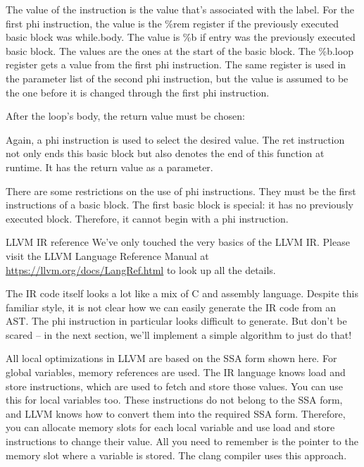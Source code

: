 The value of the instruction is the value that’s associated with the label. For the first phi instruction, the value is the \%rem register if the previously executed basic block was while.body. The value is \%b if entry was the previously executed basic block. The values are the ones at the start of the basic block. The \%b.loop register gets a value from the first phi instruction. The same register is used in the parameter list of the second phi instruction, but the value is assumed to be the one before it is changed through the first phi instruction.

After the loop’s body, the return value must be chosen:

\begin{shell}
return:
                      [ %
    ret i32 %
}
\end{shell}

Again, a phi instruction is used to select the desired value. The ret instruction not only ends this basic block but also denotes the end of this function at runtime. It has the return value as a parameter.

There are some restrictions on the use of phi instructions. They must be the first instructions of a basic block. The first basic block is special: it has no previously executed block. Therefore, it cannot begin with a phi instruction.

\begin{myTip}{LLVM IR reference}
We’ve only touched the very basics of the LLVM IR. Please visit the LLVM Language Reference Manual at \url{https://llvm.org/docs/LangRef.html} to look up all the details.
\end{myTip}

The IR code itself looks a lot like a mix of C and assembly language. Despite this familiar style, it is not clear how we can easily generate the IR code from an AST. The phi instruction in particular looks difficult to generate. But don’t be scared – in the next section, we’ll implement a simple algorithm to just do that!


All local optimizations in LLVM are based on the SSA form shown here. For global variables, memory references are used. The IR language knows load and store instructions, which are used to fetch and store those values. You can use this for local variables too. These instructions do not belong to the SSA form, and LLVM knows how to convert them into the required SSA form. Therefore, you can allocate memory slots for each local variable and use load and store instructions to change their value. All you need to remember is the pointer to the memory slot where a variable is stored. The clang compiler uses this approach.

